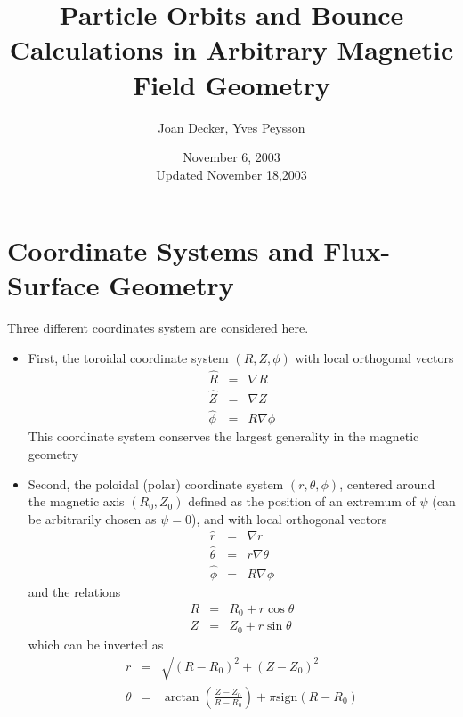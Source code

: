 \documentclass{article}
\begin{document}
\title{Particle Orbits and Bounce Calculations in Arbitrary Magnetic Field Geometry}
\date{November 6, 2003\\
Updated November 18,2003}
\author{Joan Decker, Yves Peysson}
\maketitle
\tableofcontents

\section{Coordinate Systems and Flux-Surface Geometry \label{coordi}}

Three different coordinates system are considered here.

\begin{itemize}
\item  First, the toroidal coordinate system $\left( R,Z,\phi \right) $ with
local orthogonal vectors 
\begin{eqnarray}
\widehat{R} &=&\nabla R \\
\widehat{Z} &=&\nabla Z \\
\widehat{\phi } &=&R\nabla \phi 
\end{eqnarray}
This coordinate system conserves the largest generality in the magnetic
geometry

\item  Second, the poloidal (polar) coordinate system $\left( r,\theta ,\phi
\right) $, centered around the magnetic axis $\left( R_{0},Z_{0}\right) $
defined as the position of an extremum of $\psi $ (can be arbitrarily chosen
as $\psi =0$), and with local orthogonal vectors 
\begin{eqnarray}
\widehat{r} &=&\nabla r \\
\widehat{\theta } &=&r\nabla \theta  \\
\widehat{\phi } &=&R\nabla \phi 
\end{eqnarray}
and the relations 
\begin{eqnarray}
R &=&R_{0}+r\cos \theta  \\
Z &=&Z_{0}+r\sin \theta 
\end{eqnarray}
which can be inverted as 
\begin{eqnarray}
r &=&\sqrt{\left( R-R_{0}\right) ^{2}+\left( Z-Z_{0}\right) ^{2}} \\
\theta  &=&\arctan \left( \frac{Z-Z_{0}}{R-R_{0}}\right) +\pi \text{sign}%
\left( R-R_{0}\right)   \label{theta}
\end{eqnarray}


\end{itemize}
\end{document}
